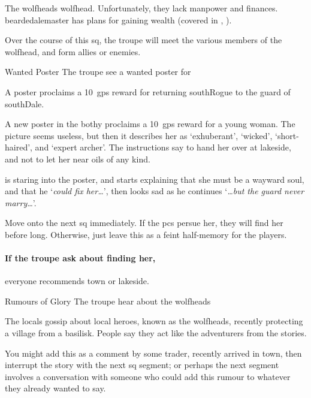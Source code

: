 \label{wolfHeads}

\noindent
The \glspl{wolfhead} \glsdesc{wolfhead}.
Unfortunately, they lack manpower and finances.
\Gls{beardedalemaster} has plans for gaining wealth (covered in , ).

Over the course of this \gls{sq}, the troupe will meet the various members of the \gls{wolfhead}, and form allies or enemies.

{\squash Wanted Poster}%
{The troupe see a wanted poster for }%

A poster proclaims a 10~\glspl{gp} reward for returning \gls{southRogue} to the \gls{guard} of \gls{southDale}.

\begin{boxtext}
  A new poster in the \gls{bothy} proclaims a 10~\glspl{gp} reward for a young woman.
  The picture seems useless, but then it describes her as `exhuberant', `wicked', `short-haired', and `expert archer'.
  The instructions say to hand her over at \gls{lakeside}, and not to let her near oils of any kind.

   is staring into the poster, and starts explaining that she must be a wayward soul, and that he `\textit{could fix her\ldots}', then looks sad as he continues `\textit{\ldots but the \gls{guard} never marry\ldots}'.
\end{boxtext}

Move onto the next \gls{sq} immediately.
If the \glspl{pc} persue her, they will find her before long.
Otherwise, just leave this as a feint half-memory for the players.

\paragraph{If the troupe ask about finding her,}
everyone recommends \gls{town} or \gls{lakeside}.

{\squash Rumours of Glory}%
{The troupe hear about the \glspl{wolfhead}}%

The locals gossip about local heroes, known as the \glspl{wolfhead}, recently protecting a \gls{village} from a basilisk.
People say they act like the adventurers from the stories.

You might add this as a comment by some trader, recently arrived in town, then interrupt the story with the next \gls{sq} \gls{segment}; or perhaps the next \gls{segment} involves a conversation with someone who could add this rumour to whatever they already wanted to say.

